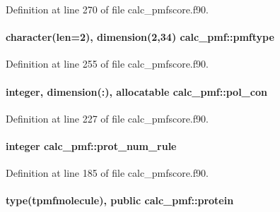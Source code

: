 Definition at line 270 of file calc\-\_\-pmfscore.\-f90.

\hypertarget{classcalc__pmf_a3030635839201df076cd664a13396090}{
\paragraph[{pmftype}]{\setlength{\rightskip}{0pt plus 5cm}character(len=2), dimension(2,34) calc\-\_\-pmf\-::pmftype}}\label{classcalc__pmf_a3030635839201df076cd664a13396090}


Definition at line 255 of file calc\-\_\-pmfscore.\-f90.

\hypertarget{classcalc__pmf_ae6bac7e8dc202b26e4acf6142e650da7}{
\paragraph[{pol\-\_\-con}]{\setlength{\rightskip}{0pt plus 5cm}integer, dimension(\-:), allocatable calc\-\_\-pmf\-::pol\-\_\-con}}\label{classcalc__pmf_ae6bac7e8dc202b26e4acf6142e650da7}


Definition at line 227 of file calc\-\_\-pmfscore.\-f90.

\hypertarget{classcalc__pmf_a1986439f8b3e283ee8d21e6b0ca9c5ff}{
\paragraph[{prot\-\_\-num\-\_\-rule}]{\setlength{\rightskip}{0pt plus 5cm}integer calc\-\_\-pmf\-::prot\-\_\-num\-\_\-rule}}\label{classcalc__pmf_a1986439f8b3e283ee8d21e6b0ca9c5ff}


Definition at line 185 of file calc\-\_\-pmfscore.\-f90.

\hypertarget{classcalc__pmf_aafcf4af6240191b24adac7de7d51fa0d}{
\paragraph[{protein}]{\setlength{\rightskip}{0pt plus 5cm}type({\bf tpmfmolecule}), public calc\-\_\-pmf\-::protein}}\label{classcalc__pmf_aafcf4af6240191b24adac7de7d51fa0d}


